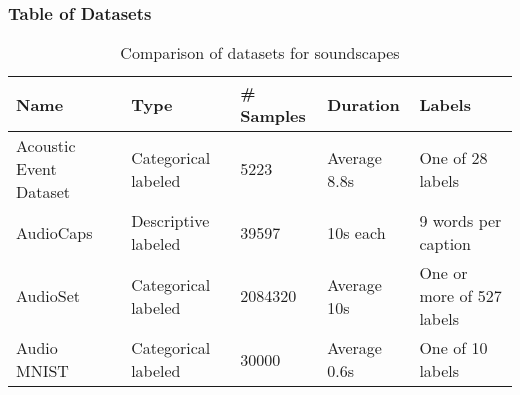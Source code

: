 \begin{frame}
    \frametitle{Table of Datasets}

    \begin{table}[ht]
        \centering
        \caption{Comparison of datasets for soundscapes}
        \label{tab:datasets}
        \begin{tabularx}{\textwidth}{|X|X|X|X|X|}
            \hline
            \textbf{Name}                                           &
            \textbf{Type}                                           &
            \textbf{\# Samples}                                     &
            \textbf{Duration}                                       &
            \textbf{Labels}                                           \\ \hline

            Acoustic Event Dataset \cite{takahashi_deep_2016}       &
            Categorical labeled                                     &
            5223                                                    &
            Average 8.8s                                            &
            One of 28 labels                                          \\ \hline

            AudioCaps \cite{kim_audiocaps_2019}                     &
            Descriptive labeled                                     &
            39597                                                   &
            10s each                                                &
            9 words per caption                                       \\ \hline

            AudioSet \cite{gemmeke_audio_2017}                      &
            Categorical labeled                                     &
            2084320                                                 &
            Average 10s                                             &
            One or more of 527 labels                                 \\ \hline

            Audio MNIST~\cite{becker_interpreting_2018}             &
            Categorical labeled                                     &
            30000                                                   &
            Average 0.6s                                            &
            One of 10 labels                                          \\ \hline


\end{tabularx}
\end{table}
\end{frame}

